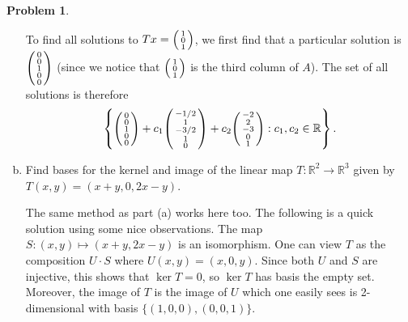 \documentclass[11pt,oneside]{amsart}
\theoremstyle{definition}
\newtheorem{problem}{Problem}
\newcommand{\bR}{\mathbb{R}}
\newcommand*\colvec[1]{\begin{psmallmatrix}#1\end{psmallmatrix}}
\begin{document}
\begin{problem}
\begin{enumerate}[(a)]
\begin{solution}
            To find all solutions to $Tx=\colvec{1\\0\\1}$, we first find that a particular solution is $\colvec{0\\0\\1\\0\\0}$ (since we notice that $\colvec{1\\0\\1}$ is the third column of $A$). The set of all solutions is therefore
            \[\left\{\colvec{0\\0\\1\\0\\0}+c_1\colvec{-1/2\\1\\-3/2\\1\\0}+c_2\colvec{-2\\2\\-3\\0\\1}:c_1,c_2\in\bR\right\}.\]
        \end{solution}
        \item Find bases for the kernel and image of the linear map $T\colon\bR^2\to\bR^3$ given by $T(x,y)=(x+y,0,2x-y)$.
        \begin{solution}
            The same method as part (a) works here too. The following is a quick solution using some nice observations. The map $S\colon (x,y)\mapsto (x+y,2x-y)$ is an isomorphism. One can view $T$ as the composition $U\cdot S$ where $U(x,y)=(x,0,y)$. Since both $U$ and $S$ are injective, this shows that $\ker T=0$, so $\ker T$ has basis the empty set. Moreover, the image of $T$ is the image of $U$ which one easily sees is 2-dimensional with basis $\{(1,0,0),(0,0,1)\}$.
        \end{solution}
        \end{enumerate}
    \end{problem}
    
\end{document}
